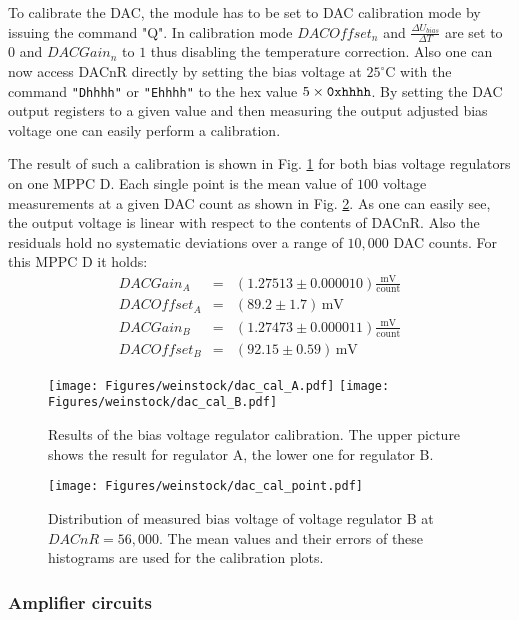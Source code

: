 \documentclass[]{article}
\begin{document}
To calibrate the DAC, the module has to be set to DAC calibration mode by issuing the command "Q". In calibration mode $DACOffset_{n}$ and $\frac{\Delta U_{bias}}{\Delta T}$ 
are set to $0$ and $DACGain_{n}$ to $1$ thus disabling the temperature correction. Also one can now access DACnR directly by setting the bias voltage 
at $25^{\circ} \text{C}$ with the command \verb|"Dhhhh"| or \verb|"Ehhhh"| to the hex value $5\times\verb|0xhhhh|$. By setting the DAC output registers to a given value and then measuring the output adjusted bias voltage one can easily perform a calibration.

The result of such a calibration is shown in Fig. \ref{fig:dac_cal} for both bias voltage regulators on one MPPC D. Each single point is the mean value of $100$ voltage measurements at a given DAC count as shown in Fig. \ref{fig:dac_cal_point}. As one can easily see, the output voltage is linear with respect to the contents of DACnR. Also the residuals hold no systematic deviations over a range of $10,000$ DAC counts. For this MPPC D it holds:
\begin{eqnarray}
	DACGain_{A} &=& (1.27513\pm0.000010)\frac{\text{mV}}{\text{count}} \nonumber \\
	DACOffset_{A} &=& (89.2\pm1.7)\,\text{mV} \nonumber \\
	DACGain_{B} &=& (1.27473\pm0.000011)\frac{\text{mV}}{\text{count}} \nonumber \\
	DACOffset_{B} &=& (92.15\pm0.59)\,\text{mV} \nonumber
\end{eqnarray}

	\begin{figure}[t]
		\centering
			\texttt{[image: Figures/weinstock/dac\_cal\_A.pdf]}
			\texttt{[image: Figures/weinstock/dac\_cal\_B.pdf]}
		\caption{Results of the bias voltage regulator calibration. The upper picture shows the result for regulator A, the lower one for regulator B.}
		\label{fig:dac_cal}
	\end{figure}
	
	\begin{figure}[t]
		\centering
			\texttt{[image: Figures/weinstock/dac\_cal\_point.pdf]}
		\caption{Distribution of measured bias voltage of voltage regulator B at $DACnR=56,000$. The mean values and their errors of these histograms are used for the calibration plots.}
		\label{fig:dac_cal_point}
	\end{figure}	

\subsubsection{Amplifier circuits}
\end{document}
